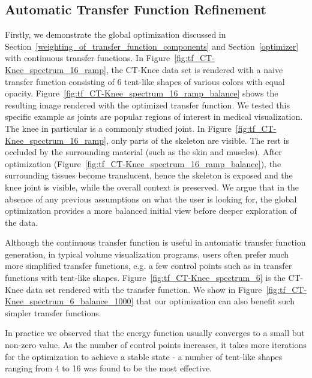 \subsection{Automatic Transfer Function Refinement \label{automatic_transfer_function_refinement}}
Firstly, we demonstrate the global optimization discussed in Section~\ref{weighting_of_transfer_function_components} and Section~\ref{optimizer} with continuous transfer functions.
In Figure~\ref{fig:tf_CT-Knee_spectrum_16_ramp}, the CT-Knee data set is rendered with a naive transfer function consisting of 6 tent-like shapes of various colors with equal opacity. Figure~\ref{fig:tf_CT-Knee_spectrum_16_ramp_balance} shows the resulting image rendered with the optimized transfer function.
We tested this specific example as joints are popular regions of interest in medical visualization.
The knee in particular is a commonly studied joint.
In Figure~\ref{fig:tf_CT-Knee_spectrum_16_ramp}, only parts of the skeleton are visible. The rest is occluded by the surrounding material (such as the skin and muscles).
After optimization (Figure~\ref{fig:tf_CT-Knee_spectrum_16_ramp_balance}), the surrounding tissues become translucent, hence the skeleton is exposed and the knee joint is visible, while the overall context is preserved. We argue that in the absence of any previous assumptions on what the user is looking for, the global optimization provides a more balanced initial view before deeper exploration of the data.

Although the continuous transfer function is useful in automatic transfer function generation, in typical volume visualization programs, users often prefer much more simplified transfer functions, e.g. a few control points such as in transfer functions with tent-like shapes. Figure~\ref{fig:tf_CT-Knee_spectrum_6} is the CT-Knee data set rendered with the transfer function. We show in Figure~\ref{fig:tf_CT-Knee_spectrum_6_balance_1000} that our optimization can also benefit such simpler transfer functions.

In practice we observed that the energy function usually converges to a small but non-zero value. As the number of control points increases, it takes more iterations for the optimization to achieve a stable state - a number of tent-like shapes ranging from 4 to 16 was found to be the most effective.

